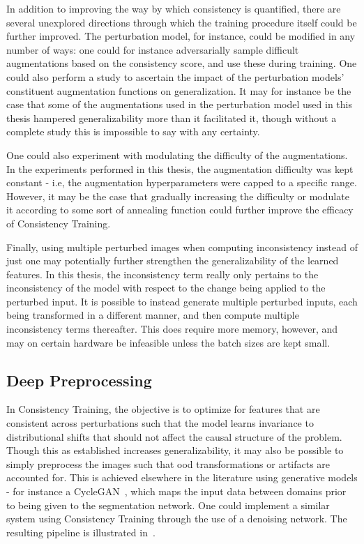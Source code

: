     In addition to improving the way by which consistency is quantified, there are several unexplored directions through which the training procedure itself could be further improved. The perturbation model, for instance, could be modified in any number of ways: one could for instance adversarially sample difficult augmentations based on the consistency score, and use these during training. One could also perform a study to ascertain the impact of the perturbation models' constituent augmentation functions on generalization. It may for instance be the case that some of the augmentations used in the perturbation model used in this thesis hampered generalizability more than it facilitated it, though without a complete study this is impossible to say with any certainty.  
    
    One could also experiment with modulating the difficulty of the augmentations. In the experiments performed in this thesis, the augmentation difficulty was kept constant - i.e, the augmentation hyperparameters were capped to a specific range. However, it may be the case that gradually increasing the difficulty or modulate it according to some sort of annealing function could further improve the efficacy of Consistency Training. 
    
    Finally, using multiple perturbed images when computing inconsistency instead of just one may potentially further strengthen the generalizability of the learned features. In this thesis, the inconsistency term really only pertains to the inconsistency of the model with respect to the change being applied to the perturbed input. It is possible to  instead generate multiple perturbed inputs, each being transformed in a different manner, and then compute multiple inconsistency terms thereafter. This does require more memory, however, and may on certain hardware be infeasible unless the batch sizes are kept small. 
    
    \subsection{Deep Preprocessing} \label{denoising}
        In Consistency Training, the objective is to optimize for features that are consistent across perturbations such that the model learns invariance to distributional shifts that should not affect the causal structure of the problem. Though this as established increases generalizability, it may also be possible to simply preprocess the images such that \gls{ood} transformations or artifacts are accounted for. This is achieved elsewhere in the literature using generative models - for instance a CycleGAN~\cite{cyclegan}, which maps the input data between domains prior to being given to the segmentation network. One could implement a similar system using Consistency Training through the use of a denoising network. The resulting pipeline is illustrated in~.
        
